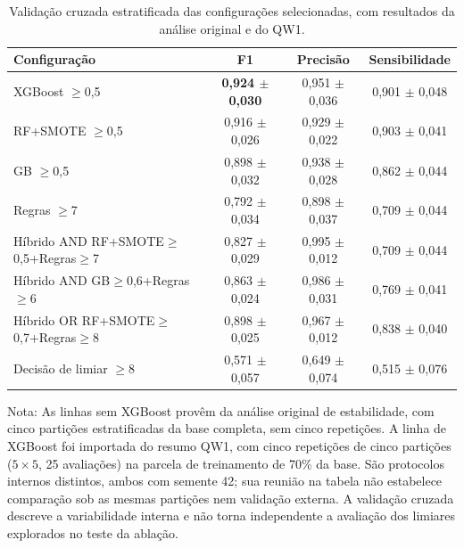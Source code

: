 \begin{table}[htbp]
\centering
\caption{Validação cruzada estratificada das configurações selecionadas, com resultados da análise original e do QW1.}
\label{tab:cv-5fold}
\begin{tabular}{lccc}
\toprule
Configura\c{c}\~ao & F1 & Precis\~ao & Sensibilidade \\
\midrule
XGBoost $\geq$0,5 & \textbf{0,924 $\pm$ 0,030} & 0,951 $\pm$ 0,036 & 0,901 $\pm$ 0,048 \\
RF+SMOTE $\geq$0,5 & 0,916 $\pm$ 0,026 & 0,929 $\pm$ 0,022 & 0,903 $\pm$ 0,041 \\
GB $\geq$0,5 & 0,898 $\pm$ 0,032 & 0,938 $\pm$ 0,028 & 0,862 $\pm$ 0,044 \\
Regras $\geq$7 & 0,792 $\pm$ 0,034 & 0,898 $\pm$ 0,037 & 0,709 $\pm$ 0,044 \\
Híbrido AND RF+SMOTE$\geq$0,5+Regras$\geq$7 & 0,827 $\pm$ 0,029 & 0,995 $\pm$ 0,012 & 0,709 $\pm$ 0,044 \\
Híbrido AND GB$\geq$0,6+Regras$\geq$6 & 0,863 $\pm$ 0,024 & 0,986 $\pm$ 0,031 & 0,769 $\pm$ 0,041 \\
Híbrido OR RF+SMOTE$\geq$0,7+Regras$\geq$8 & 0,898 $\pm$ 0,025 & 0,967 $\pm$ 0,012 & 0,838 $\pm$ 0,040 \\
Decisão de limiar $\geq$8 & 0,571 $\pm$ 0,057 & 0,649 $\pm$ 0,074 & 0,515 $\pm$ 0,076 \\
\bottomrule
\end{tabular}
\vspace{2pt}
\par\small Nota: As linhas sem XGBoost provêm da análise original de estabilidade, com cinco partições estratificadas da base completa, sem cinco repetições. A linha de XGBoost foi importada do resumo QW1, com cinco repetições de cinco partições ($5 \times 5$, 25 avaliações) na parcela de treinamento de 70\% da base. São protocolos internos distintos, ambos com semente 42; sua reunião na tabela não estabelece comparação sob as mesmas partições nem validação externa. A validação cruzada descreve a variabilidade interna e não torna independente a avaliação dos limiares explorados no teste da ablação.
\end{table}
